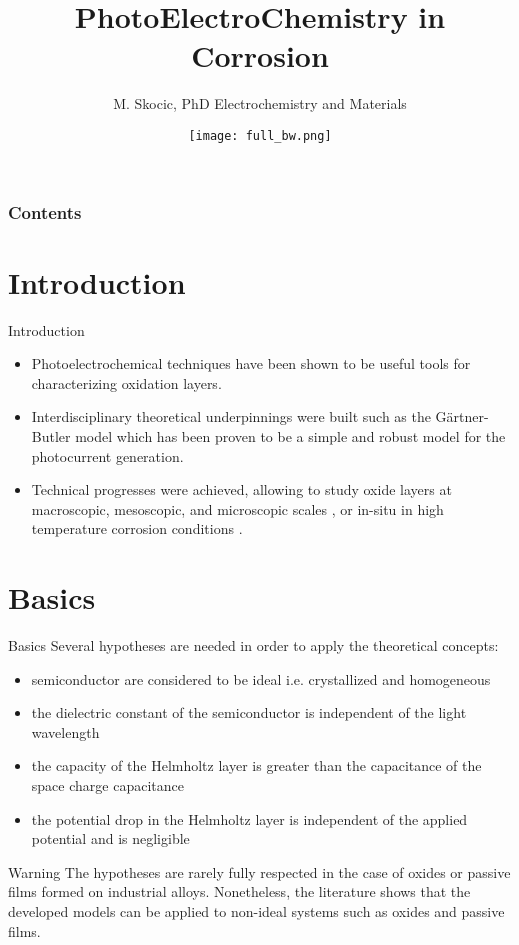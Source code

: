 \documentclass[10pt,compress]{beamer}
\title{PhotoElectroChemistry in Corrosion}
\author{M. Skocic, PhD Electrochemistry and Materials}
\date{\vfill \texttt{[image: full\_bw.png]}}
\begin{document}
\begin{frame}
    \titlepage
\end{frame}

\begin{frame}
    \frametitle{Contents}
    \tableofcontents
\end{frame}



\section{Introduction}
\begin{frame}{Introduction}
    \begin{itemize}
        \item Photoelectrochemical techniques have been shown to be useful tools for characterizing oxidation layers. 
        \item Interdisciplinary theoretical underpinnings were built \citep{morrison1980, vijh1969, stimming1986, diquarto1997, wouters2007} 
              such as the Gärtner-Butler model \citep{gaertner1959,butler1977}
              which has been proven to be a simple and robust model for the photocurrent generation. 
        \item Technical progresses were achieved, allowing to study oxide layers at 
              macroscopic, mesoscopic, and microscopic scales 
              \citep{benaboud2007, srisrual2011}, or in-situ in high temperature corrosion 
              conditions \citep{bojinov2002,skocic2016}.
    \end{itemize}
\end{frame}



\section{Basics}
\begin{frame}{Basics}
    Several hypotheses are needed in order to apply the theoretical concepts:  
    \begin{itemize}
        \item semiconductor are considered to be ideal i.e. crystallized and homogeneous  
        \item the dielectric constant of the semiconductor is independent of the light wavelength  
        \item the capacity of the Helmholtz layer is greater than the capacitance of the space charge capacitance  
        \item the potential drop in the Helmholtz layer is independent of the applied potential and is negligible
    \end{itemize}

    \tiny
    \begin{alertblock}{Warning}
        The hypotheses are rarely fully respected in the case of oxides or passive 
        films formed on industrial alloys. Nonetheless, the literature shows that the 
        developed models can be applied to non-ideal systems such as oxides 
        and passive films.
    \end{alertblock}
\end{frame}
\end{document}
